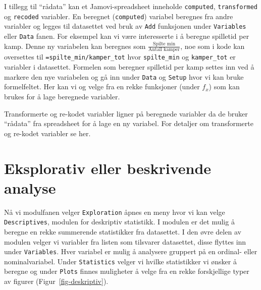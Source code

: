 \documentclass[
  letterpaper,
  DIV=11,
  numbers=noendperiod,
  oneside]{scrreprt}
\begin{document}
I tillegg til ``rådata'' kan et Jamovi-spreadsheet inneholde
\texttt{computed}, \texttt{transformed} og \texttt{recoded} variabler.
En beregnet (\texttt{computed}) variabel beregnes fra andre variabler og
legges til datasettet ved bruk av \texttt{Add} funksjonen under
\texttt{Variables} eller \texttt{Data} fanen. For eksempel kan vi være
interesserte i å beregne spilletid per kamp. Denne ny variabelen kan
beregnes som \(\frac{\text{Spilte min}}{\text{Antall kamper}}\), noe som
i kode kan oversettes til \texttt{=spilte\_min/kamper\_tot} hvor
\texttt{spilte\_min} og \texttt{kamper\_tot} er variabler i datasettet.
Formelen som beregner spilletid per kamp settes inn ved å markere den
nye variabelen og gå inn under \texttt{Data} og \texttt{Setup} hvor vi
kan bruke formelfeltet. Her kan vi og velge fra en rekke funksjoner
(under \(f_x\)) som kan brukes for å lage beregnede variabler.

Transformerte og re-kodet variabler ligner på beregnede variabler da de
bruker ``rådata'' fra spreadsheet for å lage en ny variabel. For
detaljer om transformerte og re-kodet variabler se her.

\hypertarget{eksplorativ-eller-beskrivende-analyse}{%
\section{Eksplorativ eller beskrivende
analyse}\label{eksplorativ-eller-beskrivende-analyse}}

Nå vi modulfanen velger \texttt{Exploration} åpnes en meny hvor vi kan
velge \texttt{Descriptives}, modulen for deskriptiv statistikk. I
modulen er det mulig å beregne en rekke summerende statistikker fra
datasettet. I den øvre delen av modulen velger vi variabler fra listen
som tilsvarer datasettet, disse flyttes inn under \texttt{Variables}.
Hver variabel er mulig å analysere gruppert på en ordinal- eller
nominalvariabel. Under \texttt{Statistics} velger vi hvilke statistikker
vi ønsker å beregne og under \texttt{Plots} finnes muligheter å velge
fra en rekke forskjellige typer av figurer (Figur~\ref{fig-deskriptiv}).
\end{document}
